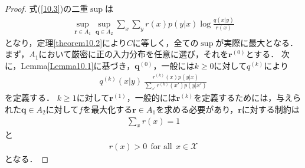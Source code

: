 \documentclass{ltjsarticle}
\theoremstyle{definition}
\begin{document}
\begin{proof}
  式(\ref{10.3})の二重$\sup$は
  \begin{eqnarray}
    \label{10.47}
    \sup_{\mathbf{r} \in A_1} \sup_{\mathbf{q} \in A_2} \sum_{x} \sum_{y} r(x) p(y|x) \log \frac{q(x|y)}{r(x)}
  \end{eqnarray}
  となり，定理\ref{theorem10.2}により$C$に等しく，全ての$\sup$が実際に最大となる．
  まず，$A_1$において厳密に正の入力分布を任意に選び，それを$\mathbf{r}^{(0)}$とする．
  次に，Lemma\ref{Lemma10.1}に基づき，$\mathbf{q}^{(0)}$，一般には$k \geq 0$に対して$q^{(k)}$により
  \begin{eqnarray}
    \label{10.48}
    q^{(k)}(x|y) \ \frac{r^{(k)}(x) p(y|x)}{\sum_{x'} r^{(k)}(x') p(y|x')}
  \end{eqnarray}
  を定義する．
  $k \geq 1$に対して$\mathbf{r}^{(1)}$，一般的には$\mathbf{r}^{(k)}$を定義するためには，与えられた$\mathbf{q} \in A_2$に対して$f$を最大化する$\mathbf{r} \in A_1$を求める必要があり，$\mathbf{r}$に対する制約は
  \begin{eqnarray}
    \label{10.49}
    \sum_{x} r(x) = 1
  \end{eqnarray}
  と
  \begin{eqnarray}
    \label{10.50}
    r(x) > 0 \ \ \mbox{for all} \ \ x \in \mathcal{X}
  \end{eqnarray}
  となる．

\end{proof}
\end{document}
